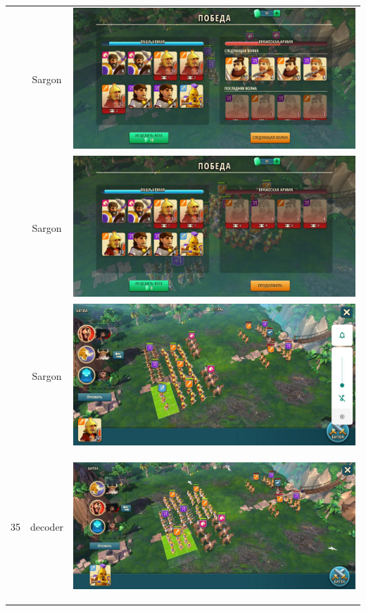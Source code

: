 \begin{longtable}{|c|c|c|}
	& Sargon &
	\includegraphics[width=0.75\linewidth]{./parts/media/TreasureHunt/35/sargon/photo_2022-04-07_10-08-41.jpg} \\
	& Sargon &
	\includegraphics[width=0.75\linewidth]{./parts/media/TreasureHunt/35/sargon/photo_2022-04-07_10-08-48.jpg} \\
	& Sargon &
	\includegraphics[width=0.75\linewidth]{./parts/media/TreasureHunt/35/sargon/photo_2022-04-07_10-08-33.jpg} \\
	\hline
	\multirow{8}{*}{35} & decoder &
	\hypertarget{fight35}{\includegraphics[width=0.75\linewidth]{./parts/media/TreasureHunt/35/decoder/photo_2022-04-07_10-05-55.jpg}} \\

\end{longtable}
